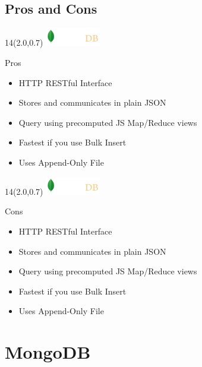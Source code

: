 \documentclass{beamer}
\newcommand{\MongoLogo}{
\begin{textblock}{14}(2.0,0.7)
  \includegraphics[height=0.8cm]{logo-mongodb-ondark.png}
\end{textblock}
}
\begin{document}
\subsection{Pros and Cons}
\begin{frame}[fragile]
  \MongoLogo

  \begin{block} {Pros}
    \begin{itemize}
      \item HTTP RESTful Interface
      \item Stores and communicates in plain JSON
      \item Query using precomputed JS Map/Reduce views
      \item Fastest if you use Bulk Insert
      \item Uses Append-Only File
    \end{itemize}
  \end{block}
\end{frame}

\begin{frame}[fragile]
  \MongoLogo

  \begin{block} {Cons}
    \begin{itemize}
      \item HTTP RESTful Interface
      \item Stores and communicates in plain JSON
      \item Query using precomputed JS Map/Reduce views
      \item Fastest if you use Bulk Insert
      \item Uses Append-Only File
    \end{itemize}
  \end{block}
\end{frame}



\section{MongoDB}
\end{document}
